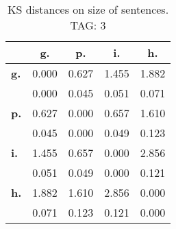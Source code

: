 \begin{table}[h!]
\begin{center}
\begin{tabular}{| l || c | c | c | c |}\hline
 & {\bf g.} & {\bf p.} & {\bf i.} & {\bf h.} \\\hline\hline
{\bf g.} & 0.000 & 0.627 & 1.455 & 1.882 \\
{\bf } & 0.000 & 0.045 & 0.051 & 0.071 \\\hline
{\bf p.} & 0.627 & 0.000 & 0.657 & 1.610 \\
{\bf } & 0.045 & 0.000 & 0.049 & 0.123 \\\hline
{\bf i.} & 1.455 & 0.657 & 0.000 & 2.856 \\
{\bf } & 0.051 & 0.049 & 0.000 & 0.121 \\\hline
{\bf h.} & 1.882 & 1.610 & 2.856 & 0.000 \\
{\bf } & 0.071 & 0.123 & 0.121 & 0.000 \\\hline
\end{tabular}
\caption{KS distances on size of sentences. TAG: 3}
\end{center}
\end{table}